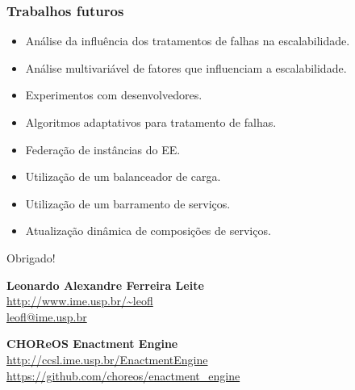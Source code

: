 \documentclass{beamer}
\begin{document}

\begin{frame}
\frametitle{Trabalhos futuros}

\begin{itemize}
\item Análise da influência dos tratamentos de falhas na escalabilidade.
\item Análise multivariável de fatores que influenciam a escalabilidade.
\item Experimentos com desenvolvedores.
\item Algoritmos adaptativos para tratamento de falhas.
\item Federação de instâncias do EE.
\item Utilização de um balanceador de carga.
\item Utilização de um barramento de serviços.
\item Atualização dinâmica de composições de serviços.
\end{itemize}

\end{frame}


\begin{frame}

{\Huge \centerline{Obrigado! }}

\vspace{1cm}

\textbf{Leonardo Alexandre Ferreira Leite} \\
\url{http://www.ime.usp.br/~leofl} \\
\url{leofl@ime.usp.br} \\

\vspace{0.6cm}

\textbf{CHOReOS Enactment Engine} \\
\url{http://ccsl.ime.usp.br/EnactmentEngine} \\
\url{https://github.com/choreos/enactment_engine}
\end{frame}

\end{document}
